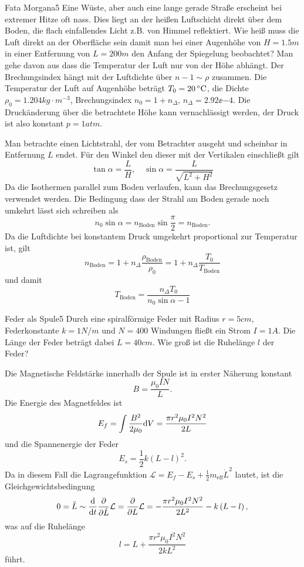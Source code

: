 \begin{problem}{Fata Morgana}{5}
Eine Wüste, aber auch eine lange gerade Straße erscheint bei extremer Hitze oft nass. Dies liegt an der heißen Luftschicht direkt über dem Boden, die flach einfallendes Licht z.B. von Himmel reflektiert. Wie heiß muss die Luft direkt an der Oberfläche sein damit man bei einer Augenhöhe von $H = 1.5 \unit{m}$ in einer Entfernung von $L = 200 \unit{m}$ den Anfang der Spiegelung beobachtet? Man gehe davon aus dass die Temperatur der Luft nur von der Höhe abhängt. Der Brechungsindex hängt mit der Luftdichte über $n-1 \sim \rho$ zusammen. Die Temperatur der Luft auf Augenhöhe beträgt $T_0 = 20 \,^\circ\mathrm{C}$, die Dichte $\rho_0 = 1.204 \unit{kg \cdot m^{-3}}$, Brechungsindex $n_0 = 1 + n_\Delta$, $n_\Delta = 2.92\ee{-4}$. \hinweis Die Druckänderung über die betrachtete Höhe kann vernachlässigt werden, der Druck ist also konstant $p = 1 \unit{atm}$.
\begin{solution}
Man betrachte einen Lichtstrahl, der vom Betrachter ausgeht und scheinbar in Entfernung $L$ endet. Für den Winkel den dieser mit der Vertikalen einschließt gilt
\[
\tan\alpha = \frac{L}{H}, \quad \sin\alpha = \frac{L}{\sqrt{L^2 + H^2}}
\]
Da die Isothermen parallel zum Boden verlaufen, kann das Brechungsgesetz verwendet werden. Die Bedingung dass der Strahl am Boden gerade noch umkehrt lässt sich schreiben als
\[
n_0 \sin\alpha = n_\mathrm{Boden} \sin\frac\pi2 = n_\mathrm{Boden}.
\]
Da die Luftdichte bei konstantem Druck umgekehrt proportional zur Temperatur ist, gilt
\[
n_\mathrm{Boden} = 1 + n_\Delta \frac{\rho_\mathrm{Boden}}{\rho_0} = 1 + n_\Delta \frac{T_0}{T_\mathrm{Boden}}
\]
und damit
\[
T_\mathrm{Boden} = \frac{ n_\Delta T_0 }{ n_0 \sin\alpha - 1 }
\]
\end{solution}
\end{problem}


\begin{problem}{Feder als Spule}{5}
Durch eine spiralförmige Feder mit Radius $r = 5 \unit{cm}$, Federkonstante $k = 1 \unit{N/m}$ und $N = 400$ Windungen fließt ein Strom $I = 1 \unit{A}$. Die Länge der Feder beträgt dabei $L = 40 \unit{cm}$. Wie groß ist die Ruhelänge $l$ der Feder?
\begin{solution}
Die Magnetische Feldstärke innerhalb der Spule ist in erster Näherung konstant
\[
B = \frac{\mu_0 I N}{L}.
\]
Die Energie des Magnetfeldes ist
\[
E_f = \int \frac{B^2}{2 \mu_0} \mathrm{d} V = \frac{\pi r^2 \mu_0 I^2 N^2 }{2 L}
\]
und die Spannenergie der Feder
\[
E_s = \frac12 k \left( L - l \right)^2.
\]
Da in diesem Fall die Lagrangefunktion $\mathcal L =E_f - E_s + \frac12 m_\mathrm{eff} \dot L^2$ lautet, ist die Gleichgewichtsbedingung
\[
0 = \ddot L \sim \frac{\mathrm{d}}{\mathrm{d} t} \frac{\partial}{\partial\dot L} \mathcal L = \frac{\partial}{\partial L} \mathcal L =  - \frac{\pi r^2 \mu_0 I^2 N^2 }{2 L^2} - k \left( L - l \right),
\]
was auf die Ruhelänge
\[
l  =  L + \frac{\pi r^2 \mu_0 I^2 N^2 }{2 k L^2}
\]
führt.
\end{solution}
\end{problem}


